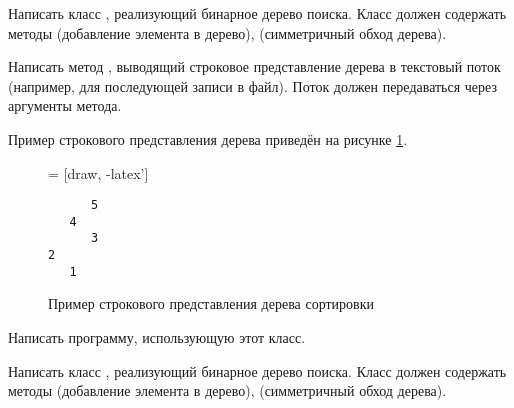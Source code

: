 \task Написать класс , реализующий бинарное дерево
поиска. Класс должен содержать методы  (добавление элемента в
дерево),  (симметричный обход дерева).

Написать метод , выводящий строковое представление дерева в
текстовый поток (например, для последующей записи в файл). Поток должен
передаваться через аргументы метода.

Пример строкового представления дерева приведён на рисунке
\ref{fig:tree-sample}.

\begin{figure}
  \centering
  \begin{minipage}[c]{0.4\textwidth}
    \centering
     = [draw, -latex']
    \usetikzlibrary{shapes,positioning}
  \end{minipage}%
  \begin{minipage}[c]{0.2\textwidth}
    \begin{framed}
      \centering
\begin{verbatim}
      5
   4
      3
2
   1
\end{verbatim}
    \end{framed}
  \end{minipage}
  
  
  \caption{Пример строкового представления дерева
    сортировки\label{fig:tree-sample}}
\end{figure}

\begin{centering}
\end{centering}

Написать программу, использующую этот класс.

\task Написать класс , реализующий бинарное дерево
поиска. Класс должен содержать методы  (добавление элемента в
дерево),  (симметричный обход дерева).

